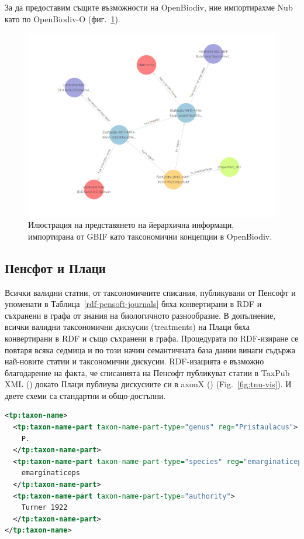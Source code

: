За да предоставим същите възможности на OpenBiodiv, ние  импортирахме Nub като  по OpenBiodiv-O (фиг.~\ref {fig:harmonia-halii-visual}).
\begin{figure}
\centering
\includegraphics[width=\textwidth]{Figures/harmonia-halii-visgraph}
\decoRule
\caption[Visual graph of \emph{Harmonia halii}]{Илюстрация на представянето на йерархична информаци, импортирана от GBIF като таксономични концепции в OpenBiodiv.}
\label{fig:harmonia-halii-visual}
\end{figure}


\subsection{Пенсфот и Плаци}

Всички валидни статии, от таксономичните списания, публикувани  от Пенсофт и упоменати в Таблица~\ref{rdf-pensoft-journals} бяха конвертирани в RDF и съхранени в графа от знания на биологичното разнообразие. В допълнение, всички валидни таксономични дискусии (treatments) на Плаци бяха конвертирани в RDF и също съхранени в графа. Процедурата по RDF-изиране се повтаря всяка седмица и по този начин семантичната база данни винаги съдържа най-новите статии и таксономични дискусии. RDF-изацията е възможно благодарение на факта, че списанията на Пенсофт публикуват статии в TaxPub XML (\cite{catapano_taxpub:_2010}) докато Плаци публиува дискусиите си в axonX (\cite{penev_xml_2011}) (Fig.~\ref{fig:tnu-vis}). И двете схеми са стандартни и общо-достъпни.

\begin{lstlisting}[language=XML,
caption=Употреба на \emph{P. emarginaticeps} в Taxpub.,
label=listing:tnu, basicstyle=\ttfamily\tiny]
<tp:taxon-name>
  <tp:taxon-name-part taxon-name-part-type="genus" reg="Pristaulacus">
    P.
  </tp:taxon-name-part>
  <tp:taxon-name-part taxon-name-part-type="species" reg="emarginaticeps">
    emarginaticeps
  </tp:taxon-name-part>
  <tp:taxon-name-part taxon-name-part-type="authority">
    Turner 1922
  </tp:taxon-name-part>
</tp:taxon-name> 
\end{lstlisting}

